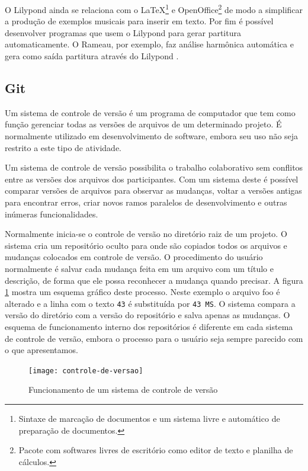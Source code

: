 O Lilypond ainda se relaciona com o \LaTeX{}\footnote{Sintaxe de
  marcação de documentos e um sistema livre e automático de preparação
  de documentos.} e OpenOffice\footnote{Pacote com softwares livres de
  escritório como editor de texto e planilha de cálculos.} de modo a
simplificar a produção de exemplos musicais para inserir em texto. Por
fim é possível desenvolver programas que usem o Lilypond para gerar
partitura automaticamente. O Rameau, por exemplo, faz análise
harmônica automática e gera como saída partitura através do Lilypond
\cite{kroger08:rameau}.

\subsection{Git}
\label{sec:git}

Um sistema de controle de versão é um programa de computador que tem
como função gerenciar todas as versões de arquivos de um determinado
projeto. É normalmente utilizado em desenvolvimento de software,
embora seu uso não seja restrito a este tipo de atividade.

Um sistema de controle de versão possibilita o trabalho colaborativo
sem conflitos entre as versões dos arquivos dos participantes. Com um
sistema deste é possível comparar versões de arquivos para observar as
mudanças, voltar a versões antigas para encontrar erros, criar novos
ramos paralelos de desenvolvimento e outras inúmeras funcionalidades.

Normalmente inicia-se o controle de versão no diretório raiz de um
projeto. O sistema cria um repositório oculto para onde são copiados
todos os arquivos e mudanças colocados em controle de versão. O
procedimento do usuário normalmente é salvar cada mudança feita em um
arquivo com um título e descrição, de forma que ele possa reconhecer a
mudança quando precisar. A figura \ref{fig:controle-de-versao} mostra
um esquema gráfico deste processo. Neste exemplo o arquivo foo é
alterado e a linha com o texto \verb!43! é substituída por
\verb!43 MS!. O sistema compara a versão do diretório com a versão do
repositório e salva apenas as mudanças. O esquema de funcionamento
interno dos repositórios é diferente em cada sistema de controle de
versão, embora o processo para o usuário seja sempre parecido com o
que apresentamos.

\begin{figure}
  \centering
  \texttt{[image: controle-de-versao]}
  \caption{Funcionamento de um sistema de controle de versão}
  \label{fig:controle-de-versao}
\end{figure}

